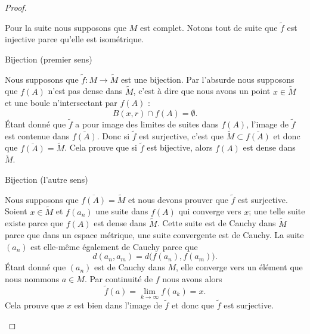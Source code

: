 \begin{proof}
\begin{subproof}
        Pour la suite nous supposons que \( M\) est complet. Notons tout de suite que \( \tilde f\) est injective parce qu'elle est isométrique.

    \item[Bijection (premier sens)]

        Nous supposons que \( \tilde f\colon M\to \tilde M\) est une bijection. Par l'absurde nous supposons que \( f(A)\) n'est pas dense dans \( \tilde M\), c'est à dire que nous avons un point \( x\in \tilde M\) et une boule n'intersectant par \( f(A)\) :
        \begin{equation}
            B(x,r)\cap f(A)=\emptyset.
        \end{equation}
        Étant donné que \( \tilde f\) a pour image des limites de suites dans \( f(A)\), l'image de \( \tilde f\) est contenue dans \( \overline{ f(A) }\). Donc si \( \tilde f\) est surjective, c'est que \( \tilde M\subset \overline{ f(A) }\) et donc que \( \overline{ f(A) }=\tilde M\). Cela prouve que si \( \tilde f\) est bijective, alors \( f(A)\) est dense dans \( \tilde M\).


    \item[Bijection (l'autre sens)]

        Nous supposons que \( \overline{ f(A) }=\tilde M\) et nous devons prouver que \( \tilde f\) est surjective. Soient \( x\in \tilde M\) et \( f(a_n)\) une suite dans \( f(A)\) qui converge vers \( x\); une telle suite existe parce que \( f(A)\) est dense dans \( \tilde M\). Cette suite est de Cauchy dans \( \tilde M\) parce que dans un espace métrique, une suite convergente est de Cauchy. La suite \( (a_n)\) est elle-même également de Cauchy parce que
        \begin{equation}
            d(a_n,a_m)=d\big( f(a_n),f(a_m) \big).
        \end{equation}
        Étant donné que \( (a_n)\) est de Cauchy dans \( M\), elle converge vers un élément que nous nommons \( a\in M\). Par continuité de \( f \) nous avons alors
        \begin{equation}
            \tilde f(a)=\lim_{k\to \infty} f(a_k)=x.
        \end{equation}
        Cela prouve que \( x\) est bien dans l'image de \( \tilde f\) et donc que \( \tilde f\) est surjective.
    \end{subproof}
\end{proof}

